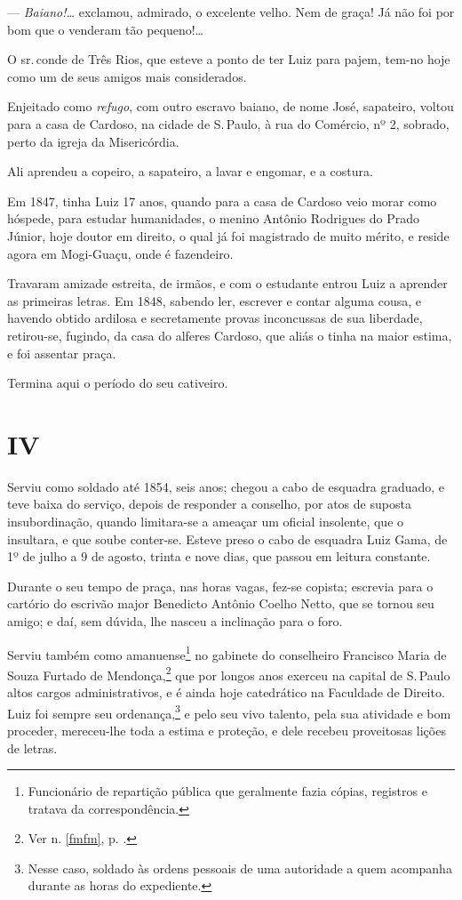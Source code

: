 --- \emph{Baiano!\ldots{}} exclamou, admirado, o excelente velho. Nem de
graça! Já não foi por bom que o venderam tão pequeno!\ldots{}

O sr.\,conde de Três Rios, que esteve a ponto de ter Luiz para pajem,
tem-no hoje como um de seus amigos mais considerados.

Enjeitado como \emph{refugo}, com outro escravo baiano, de nome José,
sapateiro, voltou para a casa de Cardoso, na cidade de S.\,Paulo, à rua
do Comércio, nº 2, sobrado, perto da igreja da Misericórdia.

Ali aprendeu a copeiro, a sapateiro, a lavar e engomar, e a costura.

Em 1847, tinha Luiz 17 anos, quando para a casa de Cardoso veio morar
como hóspede, para estudar humanidades, o menino Antônio Rodrigues do
Prado Júnior, hoje doutor em direito, o qual já foi magistrado de muito
mérito, e reside agora em Mogi-Guaçu, onde é fazendeiro.

Travaram amizade estreita, de irmãos, e com o estudante entrou Luiz a
aprender as primeiras letras. Em 1848, sabendo ler, escrever e contar
alguma cousa, e havendo obtido ardilosa e secretamente provas
inconcussas de sua liberdade, retirou-se, fugindo, da casa do alferes
Cardoso, que aliás o tinha na maior estima, e foi assentar praça.

Termina aqui o período do seu cativeiro.

\section*{IV}

Serviu como soldado até 1854, seis anos; chegou a cabo de esquadra
graduado, e teve baixa do serviço, depois de responder a conselho, por
atos de suposta insubordinação, quando limitara-se a ameaçar um oficial
insolente, que o insultara, e que soube conter-se. Esteve preso o cabo
de esquadra Luiz Gama, de 1º de julho a 9 de agosto, trinta e nove dias,
que passou em leitura constante.

Durante o seu tempo de praça, nas horas vagas, fez-se copista; escrevia
para o cartório do escrivão major Benedicto Antônio Coelho Netto, que se
tornou seu amigo; e daí, sem dúvida, lhe nasceu a inclinação para o
foro.

Serviu também como amanuense\footnote{Funcionário de repartição
  pública que geralmente fazia cópias, registros e tratava da
  correspondência.} no gabinete do conselheiro Francisco Maria de Souza
Furtado de Mendonça,\footnote{Ver n. \ref{fmfm}, p. \pageref{fmfm}.} que por longos anos exerceu na capital de S.\,Paulo
altos cargos administrativos, e é ainda hoje catedrático na Faculdade de
Direito. Luiz foi sempre seu ordenança,\footnote{Nesse caso, soldado às
  ordens pessoais de uma autoridade a quem acompanha durante as horas do
  expediente.} e pelo seu vivo talento, pela sua atividade e bom
proceder, mereceu-lhe toda a estima e proteção, e dele recebeu
proveitosas lições de letras.

